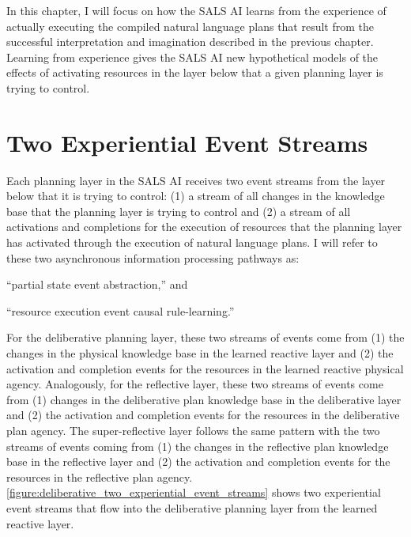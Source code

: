 In this chapter, I will focus on how the SALS AI learns from the
experience of actually executing the compiled natural language plans
that result from the successful interpretation and imagination
described in the previous chapter.  Learning from experience gives the
SALS AI new hypothetical models of the effects of activating resources
in the layer below that a given planning layer is trying to control.

\section{Two Experiential Event Streams}
\label{section:two_experiential_event_streams}

Each planning layer in the SALS AI receives two event streams from the
layer below that it is trying to control: (1) a stream of all changes
in the knowledge base that the planning layer is trying to control and
(2) a stream of all activations and completions for the execution of
resources that the planning layer has activated through the execution
of natural language plans.  I will refer to these two asynchronous
information processing pathways as:
\begin{packed_enumerate}
\item{``partial state event abstraction,'' and}
\item{``resource execution event causal rule-learning.''}
\end{packed_enumerate}
For the deliberative planning layer, these two streams of events come
from (1) the changes in the physical knowledge base in the learned
reactive layer and (2) the activation and completion events for the
resources in the learned reactive physical agency.  Analogously, for
the reflective layer, these two streams of events come from (1)
changes in the deliberative plan knowledge base in the deliberative
layer and (2) the activation and completion events for the resources
in the deliberative plan agency.  The super-reflective layer follows
the same pattern with the two streams of events coming from (1) the
changes in the reflective plan knowledge base in the reflective layer
and (2) the activation and completion events for the resources in the
reflective plan agency.
{\mbox{\autoref{figure:deliberative_two_experiential_event_streams}}}
shows two experiential event streams that flow into the deliberative
planning layer from the learned reactive layer.
